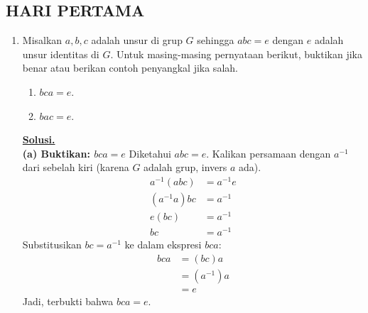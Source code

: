 \documentclass[12pt,twoside]{article}
\newenvironment{solution}
{
	\par\noindent\textbf{\underline{Solusi.}}\\
}
{
	\par
}
\begin{document}
\subsection{HARI PERTAMA}
\begin{enumerate}
  \item Misalkan $a,b,c$ adalah unsur di grup $G$ sehingga $abc=e$ dengan $e$ adalah unsur identitas di $G$. Untuk masing-masing pernyataan berikut, buktikan jika benar atau berikan contoh penyangkal jika salah.
        \begin{enumerate}
          \item $bca=e$.
          \item $bac=e$.
        \end{enumerate}
        \begin{solution}
          \textbf{(a) Buktikan: $bca=e$}
          Diketahui $abc=e$.
          Kalikan persamaan dengan $a^{-1}$ dari sebelah kiri (karena $G$ adalah grup, invers $a$ ada).
          \begin{align*}
            a^{-1}(abc) & = a^{-1}e \\
            (a^{-1}a)bc & = a^{-1}  \\
            e(bc)       & = a^{-1}  \\
            bc          & = a^{-1}
          \end{align*}
          Substitusikan $bc = a^{-1}$ ke dalam ekspresi $bca$:
          \begin{align*}
            bca & = (bc)a     \\
                & = (a^{-1})a \\
                & = e
          \end{align*}
          Jadi, terbukti bahwa $bca=e$.


\end{solution}
\end{enumerate}
\end{document}
